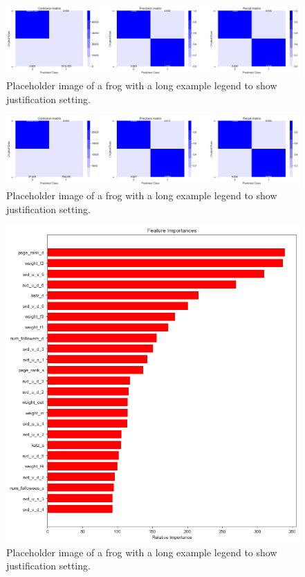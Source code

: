 \documentclass[9pt,twoside]{pnas-new}
\begin{document}
\begin{figure}%
    \centering
    \includegraphics[width=.8\linewidth]{Figures/pa_train_confusion_matrix.png}
    \caption{Placeholder image of a frog with a long example legend to show justification setting.}
    \label{fig:pa_train_confusion_matrix}
\end{figure}

\begin{figure}%
    \centering
    \includegraphics[width=.8\linewidth]{Figures/pa_test_confusion_matrix.png}
    \caption{Placeholder image of a frog with a long example legend to show justification setting.}
    \label{fig:pa_test_confusion_matrix}
\end{figure}

\begin{figure}%
    \centering
    \includegraphics[width=.8\linewidth]{Figures/pa_feature_importance.png}
    \caption{Placeholder image of a frog with a long example legend to show justification setting.}
    \label{fig:pa_feature_importance}
\end{figure}
\end{document}
